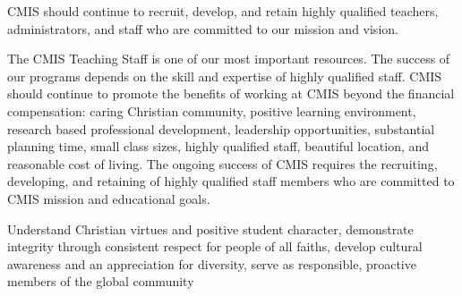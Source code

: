 
CMIS should continue to recruit, develop, and retain highly qualified teachers, administrators, and staff who are committed to our mission and vision. 


The CMIS Teaching Staff is one of our most important resources. The success of our programs depends on the skill and expertise of highly qualified staff. CMIS should continue to promote the benefits of working at CMIS beyond the financial compensation: caring Christian community, positive learning environment, research based professional development, leadership opportunities, substantial planning time, small class sizes, highly qualified staff, beautiful location, and reasonable cost of living. The ongoing success of CMIS requires the recruiting, developing, and retaining of highly qualified staff members who are committed to CMIS mission and educational goals.


Understand Christian virtues and positive student character, demonstrate integrity through consistent respect for people of all faiths, develop cultural awareness and an appreciation for diversity, serve as responsible, proactive members of the global community


